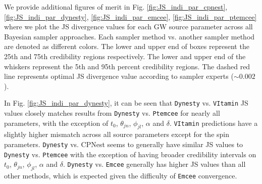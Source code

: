 We provide additional figures of merit in Fig. \ref{fig:JS_indi_par_cpnest}, 
\ref{fig:JS_indi_par_dynesty}, \ref{fig:JS_indi_par_emcee}, \ref{fig:JS_indi_par_ptemcee} where 
we plot the JS divergence values for each \ac{GW} source parameter across all Bayesian 
sampler approaches. Each sampler method vs. another sampler method are 
denoted as different colors. The lower and upper end of boxes represent the 
25th and 75th credibility regions respectively. The lower and upper end of 
the whiskers represent the 5th and 95th percent credibility regions. The 
dashed red line represents optimal JS divergence value according to 
sampler experts ($\sim 0.002$).

%
%

In Fig. \ref{fig:JS_indi_par_dynesty}, it can be seen that \texttt{Dynesty}  vs. \texttt{VItamin} JS values closely 
matches results from \texttt{Dynesty} vs. \texttt{Ptemcee} for nearly all parameters, with the exception of 
$t_0$, $\theta_{jn}$, $\phi_{jl}$, $\alpha$ and $\delta$. \texttt{VItamin} predictions 
have a slightly higher mismatch across all source parameters except for the spin
parameters. \texttt{Dynesty} vs. CPNest seems to generally have similar JS 
values to \texttt{Dynesty} vs. \texttt{Ptemcee} with the exception of having 
broader credibility intervals on $t_0$, $\theta_{jn}$, $\phi_{jl}$, $\alpha$ 
and $\delta$. \texttt{Dynesty} vs. \texttt{Emcee} generally has higher JS values 
than all other methods, which is expected given the difficulty of 
\texttt{Emcee} convergence.


